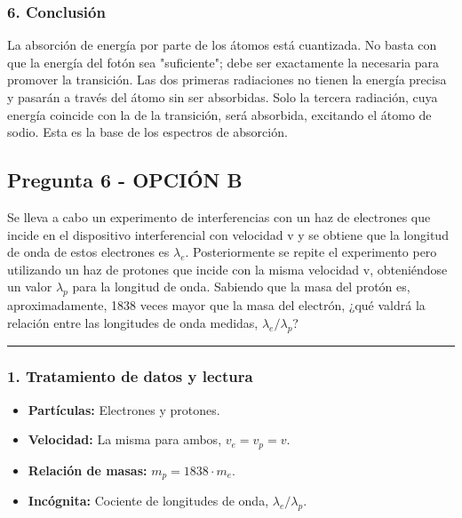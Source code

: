 \subsubsection*{6. Conclusión}
\begin{cajaconclusion}
La absorción de energía por parte de los átomos está cuantizada. No basta con que la energía del fotón sea "suficiente"; debe ser exactamente la necesaria para promover la transición. Las dos primeras radiaciones no tienen la energía precisa y pasarán a través del átomo sin ser absorbidas. Solo la tercera radiación, cuya energía coincide con la de la transición, será absorbida, excitando el átomo de sodio. Esta es la base de los espectros de absorción.
\end{cajaconclusion}

\newpage

\subsection{Pregunta 6 - OPCIÓN B}
\label{subsec:6B_2003_sep_ext}

\begin{cajaenunciado}
Se lleva a cabo un experimento de interferencias con un haz de electrones que incide en el dispositivo interferencial con velocidad v y se obtiene que la longitud de onda de estos electrones es $\lambda_e$. Posteriormente se repite el experimento pero utilizando un haz de protones que incide con la misma velocidad v, obteniéndose un valor $\lambda_p$ para la longitud de onda. Sabiendo que la masa del protón es, aproximadamente, 1838 veces mayor que la masa del electrón, ¿qué valdrá la relación entre las longitudes de onda medidas, $\lambda_e/\lambda_p$?
\end{cajaenunciado}
\hrule

\subsubsection*{1. Tratamiento de datos y lectura}
\begin{itemize}
    \item \textbf{Partículas:} Electrones y protones.
    \item \textbf{Velocidad:} La misma para ambos, $v_e = v_p = v$.
    \item \textbf{Relación de masas:} $m_p = 1838 \cdot m_e$.
    \item \textbf{Incógnita:} Cociente de longitudes de onda, $\lambda_e / \lambda_p$.
\end{itemize}

